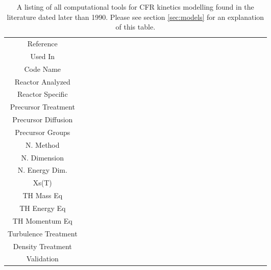 \documentclass[review]{elsarticle}
\begin{document}
\begin{landscape}
\begin{table}[h]
    \caption{A listing of all computational tools for CFR kinetics modelling
        found in the literature dated later than 1990. Please see section
        \ref{sec:models} for an explanation of this table.}
    \label{tbl:codes2}
    \begin{center}
        \begin{tabular}{|c c c c c c c c c c c c c c c c c c c c c c c c c c c|}
            \hline
            Reference &
                \cite{aufiero_development_2014} &
                \cite{cammi_dimensional_2012} &
                \cite{dulla_models_2005} &
                \cite{fiorina_modelling_2014} &
                \cite{guo_simulations_2013} &
                \cite{guerrieri_investigation_2013} &
                \cite{kophazi_development_2009} &
                \cite{kophazi_mcnp_2003} &
                \cite{krepel_dyn1d-msr_2005} &
                \cite{krepel_dyn3d-msr_2007} &
                \cite{lapenta_point_2001} &
                \cite{laureau_coupled_2015} &
                \cite{lecarpentier_neutronic_2003} &
                \cite{merle-lucotte_physical_2015} &
                \cite{nicolino_coupled_2008} &
                \cite{qiu_coupled_2016} &
                \cite{rineiski_kinetics_2005} &
                \cite{shi_development_2016} &
                \cite{suzuki_reactivity-initiated-accident_2008} &
                \cite{wang_development_2003} &
                \cite{wu_coupled_2016} &
                \cite{yamamoto_transient_2006} &
                \cite{zanetti_development_2016} &
                \cite{zanetti_extension_2015} &
                \cite{zhang_development_2009-1} &
                \cite{zhuang_studies_2015} \\
                Used In \\
                Code Name \\
                Reactor Analyzed \\
                Reactor Specific \\
                Precursor Treatment \\
                Precursor Diffusion \\
                Precursor Groups \\
                N. Method\\
                N. Dimension\\
                N. Energy Dim.\\
                Xs(T)\\
                TH Mass Eq\\
                TH Energy Eq\\
                TH Momentum Eq\\
                Turbulence Treatment\\
                Density Treatment\\
                Validation\\
            \hline
        \end{tabular}
    \end{center}
\end{table}
\end{landscape}
\end{document}
